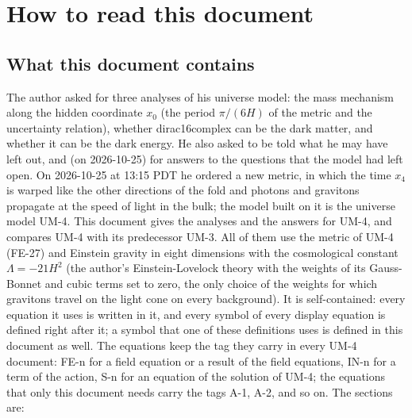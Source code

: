 \documentclass[
  10pt,
]{article}
\begin{document}
\hypertarget{how-to-read-this-document}{%
\section{How to read this document}\label{how-to-read-this-document}}

\hypertarget{what-this-document-contains}{%
\subsection{What this document
contains}\label{what-this-document-contains}}

The author asked for three analyses of his universe model: the mass
mechanism along the hidden coordinate \(x_0\) (the period \(\pi/(6H)\)
of the metric and the uncertainty relation), whether dirac16complex can
be the dark matter, and whether it can be the dark energy. He also asked
to be told what he may have left out, and (on 2026-10-25) for answers to
the questions that the model had left open. On 2026-10-25 at 13:15 PDT
he ordered a new metric, in which the time \(x_4\) is warped like the
other directions of the fold and photons and gravitons propagate at the
speed of light in the bulk; the model built on it is the universe model
UM-4. This document gives the analyses and the answers for UM-4, and
compares UM-4 with its predecessor UM-3. All of them use the metric of
UM-4 (FE-27) and Einstein gravity in eight dimensions with the
cosmological constant \(\Lambda = -21H^2\) (the author's
Einstein-Lovelock theory with the weights of its Gauss-Bonnet and cubic
terms set to zero, the only choice of the weights for which gravitons
travel on the light cone on every background). It is self-contained:
every equation it uses is written in it, and every symbol of every
display equation is defined right after it; a symbol that one of these
definitions uses is defined in this document as well. The equations keep
the tag they carry in every UM-4 document: FE-n for a field equation or
a result of the field equations, IN-n for a term of the action, S-n for
an equation of the solution of UM-4; the equations that only this
document needs carry the tags A-1, A-2, and so on. The sections are:
\end{document}
